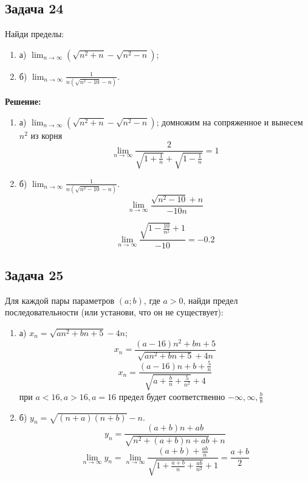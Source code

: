 \documentclass[a4paper,12pt]{article}
\begin{document}
\subsection{Задача 24}
Найди пределы:
\begin{enumerate}
    \item а) $\lim_{n \to \infty} \left(\sqrt{n^2 + n} - \sqrt{n^2 - n}\right)$;
    \item б) $\lim_{n \to \infty} \frac{1}{n\left(\sqrt{n^2-10} - n\right)}$.
\end{enumerate}
\textbf{Решение: }
\begin{enumerate}
    \item а) $\lim_{n \to \infty} \left(\sqrt{n^2 + n} - \sqrt{n^2 - n}\right)$;
    домножим на сопряженное и вынесем $n^2$ из корня
    \[
    \lim_{n \to \infty} \frac{2}{\sqrt{1 + \frac{1}{n}} + \sqrt{1 - \frac{1}{n}}}=1
    \]
    \item б) $\lim_{n \to \infty} \frac{1}{n\left(\sqrt{n^2-10} - n\right)}$.
    \[
    \lim_{n \to \infty} \frac{\sqrt{n^2-10}+n}{-10n}
    \]

    \[
    \lim_{n \to \infty} \frac{\sqrt{1-\frac{10}{n^2}}+1}{-10}=-0.2
    \]
\end{enumerate}

\subsection{Задача 25}
Для каждой пары параметров $(a; b)$, где $a > 0$, найди предел последовательности (или установи, что он не существует):
\begin{enumerate}
    \item а) $x_n = \sqrt{an^2 + bn + 5} - 4n$;
    \[
    x_n = \frac{(a - 16) n^2 + b n + 5}{\sqrt{a n^2 + b n + 5} + 4n}
    \]
    \[
    x_n = \frac{(a-16)n + b + \frac{5}{n}}{\sqrt{a+\frac{b}{n}+\frac{5}{n^2}} + 4}
    \]
    при $a<16, a>16, a=16$ предел будет соответственно $-\infty, \infty, \frac{b}{8}$

    
    \item б) $y_n = \sqrt{(n + a)(n + b)} - n$.
    \[
    y_n = \frac{(a + b) n + a b}{\sqrt{n^2 + (a + b) n + a b} + n}
    \]
    \[
    \lim_{n \to \infty} y_n = \lim_{n \to \infty} \frac{(a + b) + \frac{a b}{n}}{\sqrt{1 + \frac{a + b}{n} + \frac{a b}{n^2}} + 1}=\frac{a+b}{2}
    \]
\end{enumerate}
\end{document}
